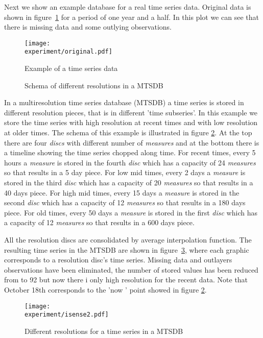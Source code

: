 
Next we show an example database for a real time series data. Original
data is shown in figure~\ref{fig:exemple:original} for a period of one
year and a half. In this plot we can see that there is missing
data and some outlying observations.


\begin{figure}[tp]
\centering
\texttt{[image: \\experiment/original.pdf]}
\caption{Example of a time series data}
\label{fig:exemple:original}
\end{figure}



\begin{figure}[tp]
\centering

\caption{Schema of different resolutions in a MTSDB}
\label{fig:exemple:window}
\end{figure}


In a multiresolution time series database (MTSDB) a time series is
stored in different resolution pieces, that is in different 'time
subseries'.  In this example we store the time series with high
resolution at recent times and with low resolution at older times. The
schema of this example is illustrated in figure
\ref{fig:exemple:window}. At the top there are four \emph{discs} with
different number of \emph{measures} and at the bottom there is a
timeline showing the time series chopped along time. For recent times,
every 5 hours a \emph{measure} is stored in the fourth \emph{disc}
which has a capacity of 24 \emph{measures} so that results in a 5 day
piece. For low mid times, every 2 days a \emph{measure} is stored in
the third \emph{disc} which has a capacity of 20 \emph{measures} so
that results in a 40 days piece. For high mid times, every 15 days a
\emph{measure} is stored in the second \emph{disc} which has a
capacity of 12 \emph{measures} so that results in a 180 days
piece. For old times, every 50 days a \emph{measure} is stored in the
first \emph{disc} which has a capacity of 12 \emph{measures} so that
results in a 600 days piece.

All the resolution discs are consolidated by average interpolation function. The resulting time series in the MTSDB are shown in figure~\ref{fig:exemple:4mrd}, where each graphic corresponds to a resolution disc's time series. Missing data and outlayers observations have been eliminated, the number of stored values has been reduced from  to 92 but now there i only high resolution for the recent data. Note that October 18th corresponds to the 'now ' point showed in figure \ref{fig:exemple:window}.


\begin{figure}[tp]
\centering
\texttt{[image: \\experiment/isense2.pdf]}
\caption{Different resolutions for a time series in a MTSDB}
\label{fig:exemple:4mrd}
\end{figure}









